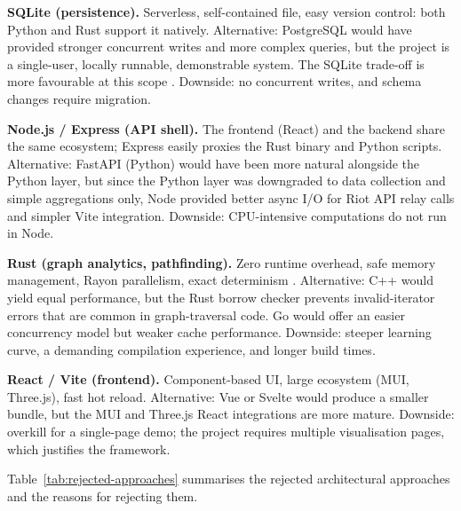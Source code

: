 \textbf{SQLite (persistence).} Serverless, self-contained file, easy version control: both Python and Rust support it natively. Alternative: PostgreSQL would have provided stronger concurrent writes and more complex queries, but the project is a single-user, locally runnable, demonstrable system. The SQLite trade-off is more favourable at this scope \cite{sqlite}. Downside: no concurrent writes, and schema changes require migration.

\textbf{Node.js / Express (API shell).} The frontend (React) and the backend share the same ecosystem; Express easily proxies the Rust binary and Python scripts. Alternative: FastAPI (Python) would have been more natural alongside the Python layer, but since the Python layer was downgraded to data collection and simple aggregations only, Node provided better async I/O for Riot API relay calls and simpler Vite integration. Downside: CPU-intensive computations do not run in Node.

\textbf{Rust (graph analytics, pathfinding).} Zero runtime overhead, safe memory management, Rayon parallelism, exact determinism \cite{jung2020,rustlang}. Alternative: C++ would yield equal performance, but the Rust borrow checker prevents invalid-iterator errors that are common in graph-traversal code. Go would offer an easier concurrency model but weaker cache performance. Downside: steeper learning curve, a demanding compilation experience, and longer build times.

\textbf{React / Vite (frontend).} Component-based UI, large ecosystem (MUI, Three.js), fast hot reload. Alternative: Vue or Svelte would produce a smaller bundle, but the MUI and Three.js React integrations are more mature. Downside: overkill for a single-page demo; the project requires multiple visualisation pages, which justifies the framework.

Table~\ref{tab:rejected-approaches} summarises the rejected architectural approaches and the reasons for rejecting them.

